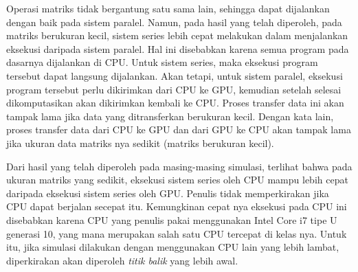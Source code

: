 Operasi matriks tidak bergantung satu sama lain, sehingga dapat dijalankan dengan baik pada sistem paralel. Namun, pada hasil yang telah diperoleh, pada matriks berukuran kecil, sistem series lebih cepat melakukan dalam menjalankan eksekusi daripada sistem paralel. Hal ini disebabkan karena semua program pada dasarnya dijalankan di CPU. Untuk sistem series, maka eksekusi program tersebut dapat langsung dijalankan. Akan tetapi, untuk sistem paralel, eksekusi program tersebut perlu dikirimkan dari CPU ke GPU, kemudian setelah selesai dikomputasikan akan dikirimkan kembali ke CPU. Proses transfer data ini akan tampak lama jika data yang ditransferkan berukuran kecil. Dengan kata lain, proses transfer data dari CPU ke GPU dan dari GPU ke CPU akan tampak lama jika ukuran data matriks nya sedikit (matriks berukuran kecil).

Dari hasil yang telah diperoleh pada masing-masing simulasi, terlihat bahwa pada ukuran matriks yang sedikit, eksekusi sistem series oleh CPU mampu lebih cepat daripada eksekusi sistem series oleh GPU. Penulis tidak memperkirakan jika CPU dapat berjalan secepat itu. Kemungkinan cepat nya eksekusi pada CPU ini disebabkan karena CPU yang penulis pakai menggunakan Intel Core i7 tipe U generasi 10, yang mana merupakan salah satu CPU tercepat di kelas nya. Untuk itu, jika simulasi dilakukan dengan menggunakan CPU lain yang lebih lambat, diperkirakan akan diperoleh \emph{titik balik} yang lebih awal.



